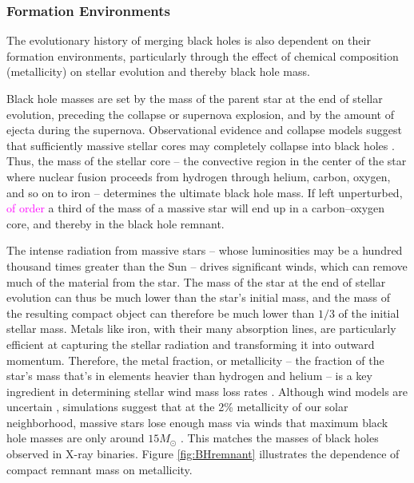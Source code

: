 \documentclass[iop,onecolumn]{revtex4}
\newcommand{\ilya}[1]{\textcolor{magenta}{#1}}
\begin{document}
\subsubsection{Formation Environments}
\label{environ}
The evolutionary history of merging black holes is also dependent on their formation environments, particularly through the effect of chemical composition (metallicity) on stellar evolution and thereby black hole mass.

Black hole masses are set by the mass of the parent star at the end of stellar evolution, preceding the collapse or supernova explosion, and by the amount of ejecta during the supernova. Observational evidence and collapse models suggest that sufficiently massive stellar cores may completely collapse into black holes \citep[for a review, see][]{Mirabel:2016}. Thus, the mass of the stellar core -- the convective region in the center of the star where nuclear fusion proceeds from hydrogen through helium, carbon, oxygen, and so on to iron -- determines the ultimate black hole mass.  If left unperturbed, \ilya{of order} a third of the mass of a massive star will end up in a carbon--oxygen core, and thereby in the black hole remnant.

The intense radiation from massive stars -- whose luminosities may be a hundred thousand times greater than the Sun -- drives significant winds, which can remove much of the material from the star. The mass of the star at the end of stellar evolution can thus be much lower than the star's initial mass, and the mass of the resulting compact object can therefore be much lower than $1/3$ of the initial stellar mass. Metals like iron, with their many absorption lines, are particularly efficient at capturing the stellar radiation and transforming it into outward momentum.  Therefore, the metal fraction, or metallicity -- the fraction of the star's mass that's in elements heavier than hydrogen and helium -- is a key ingredient in determining stellar wind mass loss rates \citep{Vink:2001}. Although wind models are uncertain \citep[e.g.,][]{Renzo:2017}, simulations suggest that at the 2\% metallicity of our solar neighborhood, massive stars lose enough mass via winds that maximum black hole masses are only around $15 M_\odot$ \citep{Belczynski:2009,Spera:2015}. This matches the masses of black holes observed in X-ray binaries. Figure \ref{fig:BHremnant} illustrates the dependence of compact remnant mass on metallicity. 
 
\end{document}

